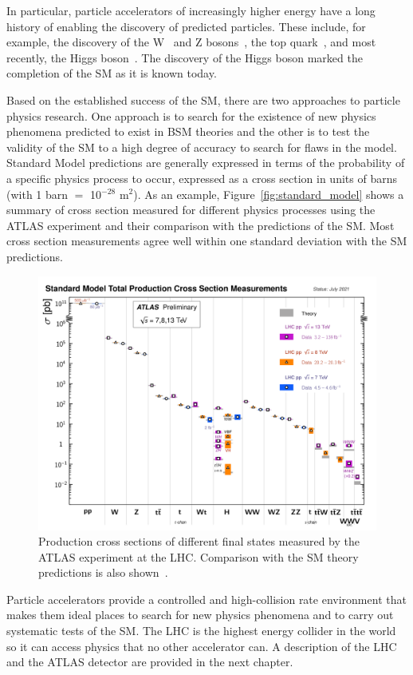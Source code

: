 In particular, particle accelerators of increasingly higher energy have a long history of enabling the discovery of predicted particles. These include, for example, the discovery of the W~\cite{arnison_W_1983, banner_observation_1983} and Z bosons~\cite{arnison_Z_1983, bagnaia_evidence_1983}, the top quark~\cite{cdf_collaboration_observation_1995, d0_collaboration_observation_1995}, and most recently, the Higgs boson~\cite{the_atlas_collaboration_observation_2012, the_cms_collaboration_observation_2012}. The discovery of the Higgs boson marked the completion of the SM as it is known today.

Based on the established success of the SM, there are two approaches to particle physics research. One approach is to search for the existence of new physics phenomena predicted to exist in BSM theories and the other is to test the validity of the SM to a high degree of accuracy to search for flaws in the model. Standard Model predictions are generally expressed in terms of the probability of a specific physics process to occur, expressed as a cross section in units of barns (with 1 barn $=$ 10$^{-28}$ m$^{2}$).  As an example, Figure~\ref{fig:standard_model} shows a summary of cross section measured for different physics processes using the ATLAS experiment and their comparison with the predictions of the SM. Most cross section measurements agree well within one standard deviation with the SM predictions. 

\begin{figure}
    \centering
    \includegraphics[width = \textwidth]{figures/atlas_cross_sections.png}
    \caption{Production cross sections of different final states measured by the ATLAS experiment at the LHC. Comparison with the SM theory predictions is also shown~\cite{atlas_public_web_sm}.}
    \label{fig:atlas_cross_sections}
\end{figure}

Particle accelerators provide a controlled and high-collision rate environment that makes them ideal places to search for new physics phenomena and to carry out systematic tests of the SM. The LHC is the highest energy collider in the world so it can access physics that no other accelerator can. A description of the LHC and the ATLAS detector are provided in the next chapter. 
